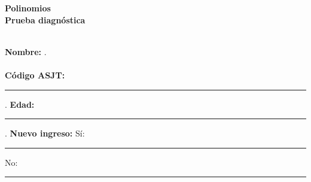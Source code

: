\begin{center} \textbf
{
    \Large Polinomios \\ \vspace{2mm}Prueba diagnóstica
}
\end{center}

\vspace{4mm}\\
\textbf{Nombre:} \hrulefill.\\
\vspace{1mm}\\
\textbf{Código ASJT:} \rule{4cm}{0.1mm}. \hspace{6mm}
\textbf{Edad:} \rule{2cm}{0.1mm}. \hspace{6mm}
\textbf{Nuevo ingreso:} Sí: \rule{5mm}{0.1mm} \hspace{5mm} No: \rule{5mm}{0.1mm}

\thispagestyle{first-page-style}